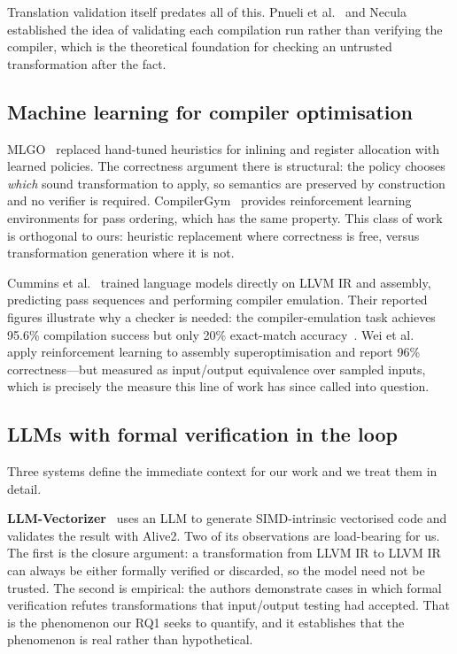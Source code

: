 \documentclass[conference]{IEEEtran}
\begin{document}
Translation validation itself predates all of this. Pnueli et
al.~\cite{pnueli} and Necula~\cite{necula} established the idea of validating
each compilation run rather than verifying the compiler, which is the
theoretical foundation for checking an untrusted transformation after the fact.

\subsection{Machine learning for compiler optimisation}

MLGO~\cite{mlgo} replaced hand-tuned heuristics for inlining and register
allocation with learned policies. The correctness argument there is structural:
the policy chooses \emph{which} sound transformation to apply, so semantics are
preserved by construction and no verifier is required. CompilerGym~\cite{gym}
provides reinforcement learning environments for pass ordering, which has the
same property. This class of work is orthogonal to ours: heuristic replacement
where correctness is free, versus transformation generation where it is not.

Cummins et al.~\cite{llmco,llmcompiler} trained language models directly on
LLVM IR and assembly, predicting pass sequences and performing compiler
emulation. Their reported figures illustrate why a checker is needed: the
compiler-emulation task achieves 95.6\% compilation success but only 20\%
exact-match accuracy~\cite{llmveriopt}. Wei et al.~\cite{supercoder} apply
reinforcement learning to assembly superoptimisation and report 96\%
correctness---but measured as input/output equivalence over sampled inputs,
which is precisely the measure this line of work has since called into
question.

\subsection{LLMs with formal verification in the loop}

Three systems define the immediate context for our work and we treat them in
detail.

\textbf{LLM-Vectorizer}~\cite{llmvectorizer} uses an LLM to generate
SIMD-intrinsic vectorised code and validates the result with Alive2. Two of its
observations are load-bearing for us. The first is the closure argument: a
transformation from LLVM IR to LLVM IR can always be either formally verified
or discarded, so the model need not be trusted. The second is empirical: the
authors demonstrate cases in which formal verification refutes transformations
that input/output testing had accepted. That is the phenomenon our RQ1 seeks to
quantify, and it establishes that the phenomenon is real rather than
hypothetical.
\end{document}
